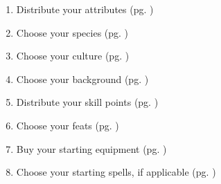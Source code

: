 
\begin{enumerate}
    \item Distribute your attributes (pg. \pageref{attributes})
    \item Choose your species (pg. \pageref{species})
    \item Choose your culture (pg. \pageref{culture})
    \item Choose your background (pg. \pageref{background})
    \item Distribute your skill points (pg. \pageref{skills})
    \item Choose your feats (pg. \pageref{feats})
    \item Buy your starting equipment (pg. \pageref{equipment})
    \item Choose your starting spells, if applicable (pg. \pageref{magic})
\end{enumerate}

